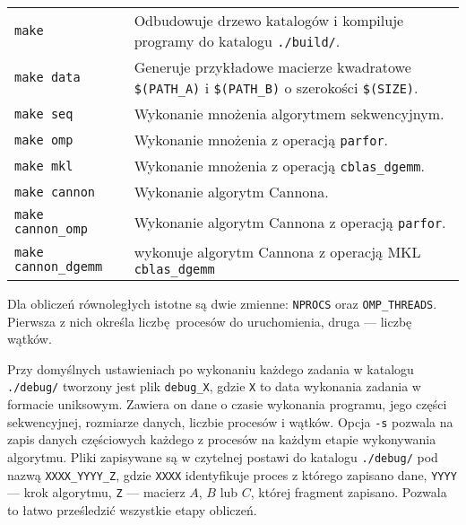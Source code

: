 \noindent\begin{tabular}{p{4cm}p{9cm}}
\texttt{make} & Odbudowuje drzewo katalogów i kompiluje programy do katalogu \texttt{./build/}. \\
\texttt{make data} & Generuje przykładowe macierze kwadratowe \texttt{\$(PATH\_A)} i \texttt{\$(PATH\_B)} o szerokości \texttt{\$(SIZE)}. \\
\texttt{make seq} & Wykonanie mnożenia algorytmem sekwencyjnym. \\
\texttt{make omp} & Wykonanie mnożenia z operacją \texttt{parfor}. \\
\texttt{make mkl} & Wykonanie mnożenia z operacją \texttt{cblas\_dgemm}. \\
\texttt{make cannon} & Wykonanie algorytm Cannona.\\
\texttt{make cannon\_omp} & Wykonanie algorytm Cannona z operacją \texttt{parfor}.\\ 
\texttt{make cannon\_dgemm} & wykonuje algorytm Cannona z operacją MKL \texttt{cblas\_dgemm}
\end{tabular}


\vspace{5mm}
Dla obliczeń równoległych istotne są dwie zmienne: \texttt{NPROCS} oraz \texttt{OMP\_THR\-EADS}. Pierwsza z nich określa liczbę procesów do uruchomienia, druga --- liczbę wątków.

Przy domyślnych ustawieniach po wykonaniu każdego zadania w katalogu \texttt{./debug/} tworzony jest plik \texttt{debug\_X}, gdzie \texttt{X} to data wykonania zadania w formacie uniksowym. Zawiera on dane o czasie wykonania programu, jego części sekwencyjnej, rozmiarze danych, liczbie procesów i wątków. Opcja \texttt{-s} pozwala na zapis danych częściowych każdego z procesów na każdym etapie wykonywania algorytmu. Pliki zapisywane są w czytelnej postawi do katalogu \texttt{./debug/} pod nazwą \texttt{XXXX\_YYYY\_Z}, gdzie \texttt{XXXX} identyfikuje proces z którego zapisano dane, \texttt{YYYY} --- krok algorytmu, \texttt{Z} --- macierz \(A\), \(B\) lub \(C\), której fragment zapisano. Pozwala to łatwo prześledzić wszystkie etapy obliczeń.










